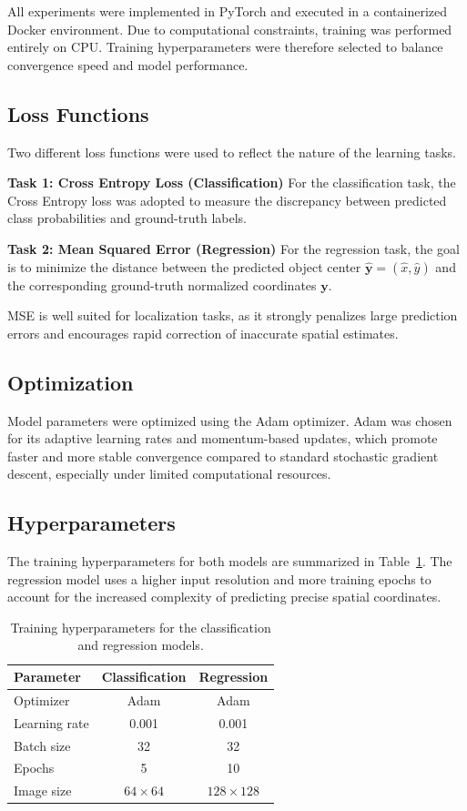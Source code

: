 \documentclass[a4paper,11pt]{article}
\begin{document}
All experiments were implemented in PyTorch and executed in a containerized
Docker environment. Due to computational constraints, training was performed
entirely on CPU. Training hyperparameters were therefore selected to balance
convergence speed and model performance.

\subsection{Loss Functions}

Two different loss functions were used to reflect the nature of the learning
tasks.

\textbf{Task 1: Cross Entropy Loss (Classification)}
For the classification task, the Cross Entropy loss was adopted to measure the
discrepancy between predicted class probabilities and ground-truth labels.


\textbf{Task 2: Mean Squared Error (Regression)}
For the regression task, the goal is to minimize the distance between the
predicted object center $\hat{\mathbf{y}} = (\hat{x}, \hat{y})$ and the
corresponding ground-truth normalized coordinates $\mathbf{y}$. 

MSE is well suited for localization tasks, as it strongly penalizes large
prediction errors and encourages rapid correction of inaccurate spatial
estimates.

\subsection{Optimization}

Model parameters were optimized using the Adam optimizer. Adam was chosen for
its adaptive learning rates and momentum-based updates, which promote faster
and more stable convergence compared to standard stochastic gradient descent,
especially under limited computational resources.

\subsection{Hyperparameters}

The training hyperparameters for both models are summarized in
Table~\ref{tab:hyperparams}. The regression model uses a higher input resolution
and more training epochs to account for the increased complexity of predicting
precise spatial coordinates.

\begin{table}[H]
\centering
\begin{tabular}{|l|c|c|}
\hline
\textbf{Parameter} & \textbf{Classification} & \textbf{Regression} \\
\hline
Optimizer & Adam & Adam \\
Learning rate & 0.001 & 0.001 \\
Batch size & 32 & 32 \\
Epochs & 5 & 10 \\
Image size & $64 \times 64$ & $128 \times 128$ \\
\hline
\end{tabular}
\caption{Training hyperparameters for the classification and regression models.}
\label{tab:hyperparams}
\end{table}
\end{document}
